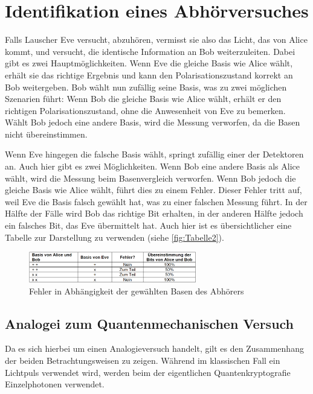 \section{Identifikation eines Abhörversuches}

Falls Lauscher Eve versucht, abzuhören, vermisst sie also das Licht, das von Alice kommt, und versucht, die identische Information an Bob weiterzuleiten. Dabei gibt es zwei Hauptmöglichkeiten. Wenn Eve die gleiche Basis wie Alice wählt, erhält sie das richtige Ergebnis und kann den Polarisationszustand korrekt an Bob weitergeben. Bob wählt nun zufällig seine Basis, was zu zwei möglichen Szenarien führt: Wenn Bob die gleiche Basis wie Alice wählt, erhält er den richtigen Polarisationszustand, ohne die Anwesenheit von Eve zu bemerken. Wählt Bob jedoch eine andere Basis, wird die Messung verworfen, da die Basen nicht übereinstimmen.

Wenn Eve hingegen die falsche Basis wählt, springt zufällig einer der Detektoren an. Auch hier gibt es zwei Möglichkeiten. Wenn Bob eine andere Basis als Alice wählt, wird die Messung beim Basenvergleich verworfen. Wenn Bob jedoch die gleiche Basis wie Alice wählt, führt dies zu einem Fehler. Dieser Fehler tritt auf, weil Eve die Basis falsch gewählt hat, was zu einer falschen Messung führt. In der Hälfte der Fälle wird Bob das richtige Bit erhalten, in der anderen Hälfte jedoch ein falsches Bit, das Eve übermittelt hat.
Auch hier ist es übersichtlicher eine Tabelle zur Darstellung zu verwenden (siehe \autoref{fig:Tabelle2}).
\begin{figure}[H]
	\centering
	\includegraphics[width=0.65\textwidth]{content/grafik/Tabelle2.png}
	\caption{Fehler in Abhängigkeit der gewählten Basen des Abhörers \cite{krypt}}
	\label{fig:Tabelle2}
\end{figure}

\subsection{Analogei zum Quantenmechanischen Versuch}
Da es sich hierbei um einen Analogieversuch handelt, gilt es den Zusammenhang der beiden Betrachtungsweisen zu zeigen. Während im klassischen Fall ein Lichtpuls verwendet wird, werden beim der eigentlichen Quantenkryptografie Einzelphotonen verwendet.
